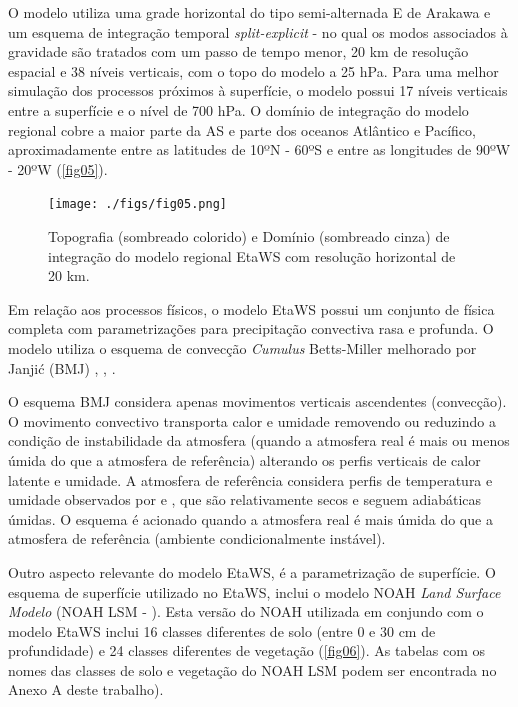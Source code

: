 O modelo utiliza uma grade horizontal do tipo semi-alternada E de Arakawa \cite{arakawalamb77} e um esquema de integração temporal \textit{split-explicit} - no qual os modos associados à gravidade são tratados com um passo de tempo menor, 20 km de resolução espacial e 38 níveis verticais, com o topo do modelo a 25 hPa. Para uma melhor simulação dos processos próximos à superfície, o modelo possui 17 níveis verticais entre a superfície e o nível de 700 hPa. O domínio de integração do modelo regional cobre a maior parte da AS e parte dos oceanos Atlântico e Pacífico, aproximadamente entre as latitudes de 10ºN - 60ºS e entre as longitudes de 90ºW - 20ºW (\autoref{fig05}). 

\begin{figure}[!hbp]
\centering
\texttt{[image: ./figs/fig05.png]}
\caption{Topografia (sombreado colorido) e Domínio (sombreado cinza) de integração do modelo regional EtaWS com resolução horizontal de 20 km.}
\label{fig05}
\end{figure}

Em relação aos processos físicos, o modelo EtaWS possui um conjunto de física completa com parametrizações para precipitação convectiva rasa e profunda. O modelo utiliza o esquema de convecção \textit{Cumulus} Betts-Miller melhorado por Janjić (BMJ) \cite{betts86}, \cite{bettsmiller86}, \cite{janjic94}. 

O esquema BMJ considera apenas movimentos verticais ascendentes (convecção). O movimento convectivo transporta calor e umidade removendo ou reduzindo a condição de instabilidade da atmosfera (quando a atmosfera real é mais ou menos úmida do que a atmosfera de referência) alterando os perfis verticais de calor latente e umidade. A atmosfera de referência considera perfis de temperatura e umidade observados por  e , que são relativamente secos e seguem adiabáticas úmidas. O esquema é acionado quando a atmosfera real é mais úmida do que a atmosfera de referência (ambiente condicionalmente instável).

Outro aspecto relevante do modelo EtaWS, é a parametrização de superfície. O esquema de superfície utilizado no EtaWS, inclui o modelo NOAH \textit{Land Surface Modelo} (NOAH LSM - \cite{mitchell01}). Esta versão do NOAH utilizada em conjundo com o modelo EtaWS inclui 16 classes diferentes de solo (entre 0 e 30 cm de profundidade) e 24 classes diferentes de vegetação (\autoref{fig06}). As tabelas com os nomes das classes de solo e vegetação do NOAH LSM podem ser encontrada no Anexo A deste trabalho).

